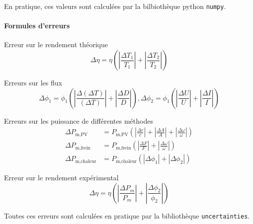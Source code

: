 En pratique, ces valeurs sont calculées par la bilbiothèque python \texttt{numpy}.

\paragraph*{Formules d'erreurs}

Erreur sur le rendement théorique
\begin{equation}
    \Delta \eta = \eta \left( \left|\frac{\Delta T_1}{T_1}\right| + \left|\frac{\Delta T_2}{T_2}\right| \right)
\end{equation}

Erreurs sur les flux
\begin{equation}
    \Delta \phi_1 = \phi_1 \left( \left|\frac{\Delta (\Delta T)}{(\Delta T)}\right| + \left|\frac{\Delta D}{D}\right| \right), 
    \Delta \phi_2 = \phi_1 \left( \left|\frac{\Delta U}{U}\right| + \left|\frac{\Delta I}{I}\right| \right)
\end{equation}

Erreurs sur les puissance de différentes méthodes
\begin{align}
    \Delta P_\textrm{m,PV} &= P_\textrm{m,PV} \left( \left|\frac{\Delta c}{c}\right| + \left|\frac{\Delta A}{A}\right| + \left|\frac{\Delta \omega}{\omega}\right| \right)\\
    \Delta P_\textrm{m,frein} &= P_\textrm{m,frein} \left( \left|\frac{\Delta F}{F}\right| + \left|\frac{\Delta \omega}{\omega}\right| \right)\\
    \Delta P_\textrm{m,chaleur} &= P_\textrm{m,chaleur} (|\Delta \phi_1| + |\Delta \phi_2|)
\end{align}

Erreur sur le rendement expérimental 
\begin{equation}
    \Delta \eta = \eta \left( \left|\frac{\Delta P_m}{P_m}\right| + \left|\frac{\Delta \phi_2}{\phi_2}\right| \right)
\end{equation}

Toutes ces erreurs sont calculées en pratique par la bibliothèque \texttt{uncertainties}.
